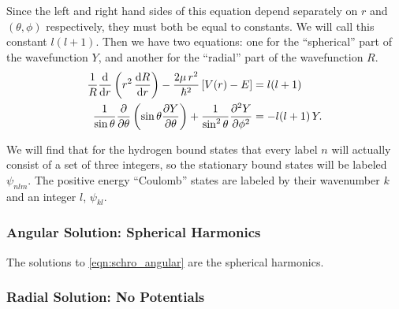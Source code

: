 \documentclass[12pt]{article}
\numberwithin{equation}{section}
\begin{document}
Since the left and right hand sides of this equation depend separately on $r$ and $(\theta, \phi)$ respectively, they must both be equal to constants. We will call this constant $l(l+1)$. Then we have two equations: one for the ``spherical'' part of the wavefunction $Y$, and another for the ``radial'' part of the wavefunction $R$.
\begin{align}
\label{eqn:schro_radial}
\frac{1}{R} \dv{r} \left(r^2 \, \dv{R}{r}\right) - \frac{2\mu \, r^2}{\hbar^2} \left[V(r) - E\right] &= l(l+1) \\
\label{eqn:schro_angular}
\frac{1}{\sin{\theta}} \pdv{\theta} \left(\sin{\theta} \pdv{Y}{\theta}\right) + \frac{1}{\sin^2{\theta}} \pdv[2]{Y}{\phi} &= -l(l+1) \, Y. 
\end{align}

We will find that for the hydrogen bound states that every label $n$ will actually consist of a set of three integers, so the stationary bound states will be labeled $\psi_{nlm}$. The positive energy ``Coulomb'' states are labeled by their wavenumber $k$ and an integer $l$, $\psi_{kl}$.

\subsubsection{Angular Solution: Spherical Harmonics}

The solutions to \eqref{eqn:schro_angular} are the spherical harmonics.

\subsubsection{Radial Solution: No Potentials}
\end{document}

